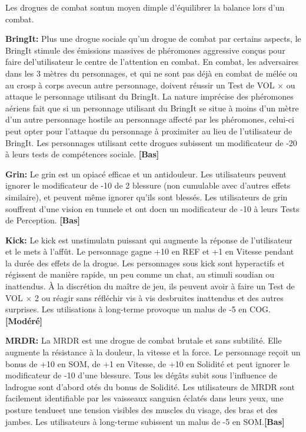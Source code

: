 Les drogues de combat sontun moyen dimple d'équilibrer la balance lors d'un combat. 

\textbf{BringIt:} Plus une drogue sociale qu'un drogue de combat par certains aspects, le BringIt stimule des émissions massives de phéromones aggressive conçus pour faire del'utilisateur le centre de l'attention en combat. En combat, les adversaires dans les 3 mètres du personnages, et qui ne sont pas déjà en combat de mélée ou au crosp à corps avecun autre personnage, doivent réussir un Test de VOL $\times$ ou attaque le personnage utilisant du BringIt. La nature imprécise des phéromones aériens fait que si un personnage utilisant du BringIt se situe à moins d'un mètre d'un autre personnage hostile au personnage affecté par les phéromones, celui-ci peut opter pour l'attaque du personnage à proximiter au lieu de l'utilisateur de BringIt. Les personnages utilisant cette drogues subissent un modificateur de -20 à leurs tests de compétences sociale. \textbf{[Bas]} 

\textbf{Grin:} Le grin est un opiacé efficae et un antidouleur. Les utilisateurs peuvent ignorer le modificateur de -10 de 2 blessure (non cumulable avec d'autres effets similaire), et peuvent même ignorer qu'ils sont blessés. Les utilisateurs de grin souffrent d'une vision en tunnele et ont docn un modificateur de -10 à leurs Tests de Perception. \textbf{[Bas]} 

\textbf{Kick:} Le kick est unstimulatn puissant qui augmente la réponse de l'utilisateur et le mets à l'affût. Le personnage gagne +10 en REF et +1 en Vitesse pendant la durée des effets de la drogue. Les personnages sous kick sont hyperactifs et régissent de manière rapide, un peu comme un chat, au stimuli soudian ou inattendus. À la discrétion du maître de jeu, ils peuvent avoir à faire un Test de VOL $\times$ 2 ou réagir sans réfléchir vis à vis desbruites inattendus et des autres surprises. Les utilisations à long-terme provoque un malus de -5 en COG. \textbf{[Modéré]} 

\textbf{MRDR:} La MRDR est une drogue de combat brutale et sans subtilité. Elle augmente la résistance à la douleur, la vitesse et la force. Le personnage reçoit un bonus de +10 en SOM, de +1 en Vitesse, de +10 en Solidité et peut ignorer le modificateur de -10 d'une blessure. Tous les dégâts subit sous l'influence de ladrogue sont d'abord otés du bonus de Solidité. Les utilisateurs de MRDR sont facilement identifiable par les vaisseaux sanguisn éclatés dans leurs yeux, une posture tendueet une tension visibles des muscles du visage, des bras et des jambes. Les utilisateurs à long-terme subissent un malus de -5 en SOM.\textbf{[Bas]} 

